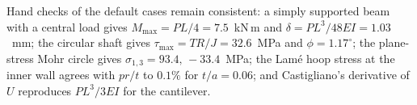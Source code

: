 \documentclass[11pt,a4paper]{article}
\begin{document}
Hand checks of the default cases remain consistent: a simply supported beam with a central load gives $M_{\max}=PL/4=7.5$~kN\,m and $\delta=PL^3/48EI=1.03$~mm; the circular shaft gives $\tau_{\max}=TR/J=32.6$~MPa and $\phi=1.17^\circ$; the plane-stress Mohr circle gives $\sigma_{1,3}=93.4,\,-33.4$~MPa; the Lam\'e hoop stress at the inner wall agrees with $pr/t$ to $0.1\%$ for $t/a=0.06$; and Castigliano's derivative of $U$ reproduces $PL^3/3EI$ for the cantilever.
\end{document}
